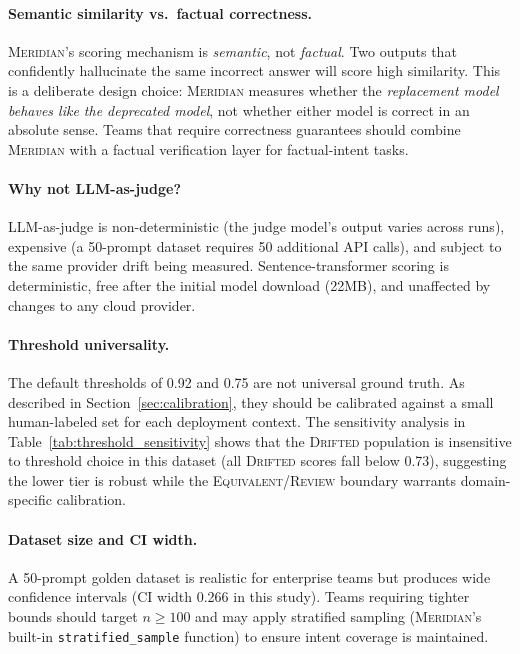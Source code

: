 \documentclass[11pt,a4paper]{article}
\begin{document}
\paragraph{Semantic similarity vs.\ factual correctness.}
\textsc{Meridian}'s scoring mechanism is \emph{semantic}, not \emph{factual}.
Two outputs that confidently hallucinate the same incorrect answer will score
high similarity.
This is a deliberate design choice: \textsc{Meridian} measures whether the
\emph{replacement model behaves like the deprecated model}, not whether either
model is correct in an absolute sense.
Teams that require correctness guarantees should combine \textsc{Meridian} with
a factual verification layer for factual-intent tasks.

\paragraph{Why not LLM-as-judge?}
LLM-as-judge \citep{arXiv2604.27082} is non-deterministic (the judge model's
output varies across runs), expensive (a 50-prompt dataset requires 50 additional
API calls), and subject to the same provider drift being measured.
Sentence-transformer scoring is deterministic, free after the initial model
download (22MB), and unaffected by changes to any cloud provider.

\paragraph{Threshold universality.}
The default thresholds of 0.92 and 0.75 are not universal ground truth.
As described in Section~\ref{sec:calibration}, they should be calibrated against
a small human-labeled set for each deployment context.
The sensitivity analysis in Table~\ref{tab:threshold_sensitivity} shows that
the \textsc{Drifted} population is insensitive to threshold choice in this dataset
(all \textsc{Drifted} scores fall below 0.73), suggesting the lower tier is robust
while the \textsc{Equivalent}/\textsc{Review} boundary warrants domain-specific
calibration.

\paragraph{Dataset size and CI width.}
A 50-prompt golden dataset is realistic for enterprise teams but produces wide
confidence intervals (CI width 0.266 in this study).
Teams requiring tighter bounds should target $n \geq 100$ and may apply stratified
sampling (\textsc{Meridian}'s built-in \texttt{stratified\_sample} function)
to ensure intent coverage is maintained.
\end{document}
